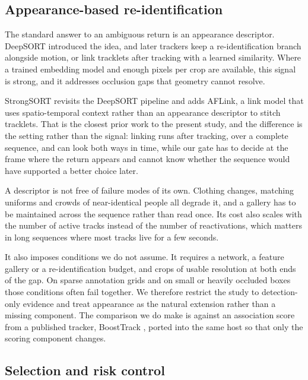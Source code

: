 \subsection{Appearance-based re-identification}

The standard answer to an ambiguous return is an appearance descriptor.
DeepSORT \cite{wojke2017deepsort} introduced the idea, and later trackers
keep a re-identification branch alongside motion, or link tracklets after
tracking with a learned similarity. Where a trained embedding model and
enough pixels per crop are available, this signal is strong, and it
addresses occlusion gaps that geometry cannot resolve.

StrongSORT \cite{du2023strongsort} revisits the DeepSORT pipeline and adds
AFLink, a link model that uses spatio-temporal context rather than an
appearance descriptor to stitch tracklets. That is the closest prior work
to the present study, and the difference is the setting rather than the
signal: linking runs after tracking, over a complete sequence, and can look
both ways in time, while our gate has to decide at the frame where the
return appears and cannot know whether the sequence would have supported a
better choice later.

A descriptor is not free of failure modes of its own. Clothing changes,
matching uniforms and crowds of near-identical people all degrade it, and a
gallery has to be maintained across the sequence rather than read once. Its
cost also scales with the number of active tracks instead of the number of
reactivations, which matters in long sequences where most tracks live for a
few seconds.

It also imposes conditions we do not assume. It requires a network, a
feature gallery or a re-identification budget, and crops of usable
resolution at both ends of the gap. On sparse annotation grids and on
small or heavily occluded boxes those conditions often fail together. We
therefore restrict the study to detection-only evidence and treat
appearance as the natural extension rather than a missing component. The
comparison we do make is against an association score from a published
tracker, BoostTrack \cite{stanjoevic2024boosttrack}, ported into the same
host so that only the scoring component changes.

\subsection{Selection and risk control}

